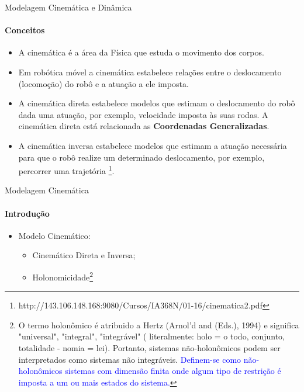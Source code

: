 \documentclass{beamer}
\begin{document}
\begin{frame}{Modelagem Cinemática e Dinâmica}
    \framesubtitle{Conceitos}
    \begin{itemize}
        \item A cinemática é a área da Física que estuda o movimento dos corpos.
        \item Em robótica móvel a cinemática estabelece relações entre o deslocamento (locomoção) do robô e a atuação a ele imposta.
        \item A cinemática direta estabelece modelos que estimam o deslocamento do robô dada uma atuação, por exemplo, velocidade imposta às suas rodas. A cinemática direta está relacionada as \textbf{Coordenadas Generalizadas}.
        \item A cinemática inversa estabelece modelos que estimam a atuação necessária para que o robô realize um determinado deslocamento, por exemplo, percorrer uma trajetória \footnote{http://143.106.148.168:9080/Cursos/IA368N/01-16/cinematica2.pdf}.
    \end{itemize}
\end{frame}


\begin{frame}{Modelagem Cinemática}
    \framesubtitle{Introdução}
    \setlength\extrarowheight{5pt}
    \begin{itemize}
        \item Modelo Cinemático:
              \begin{itemize}
                  \item Cinemático Direta e Inversa;
                  \item Holonomicidade\footnote{O termo holonômico é atribuido a Hertz (Arnol'd and (Eds.), 1994) e significa "universal", "integral", "integrável" ( literalmente: holo = o todo, conjunto, totalidade - nomia = lei). Portanto, sistemas não-holonômicos podem ser interpretados como sistemas não integráveis. \textcolor{blue}{Definem-se como não-holonômicos sistemas com dimensão finita onde algum tipo de restrição é imposta a um ou mais estados do sistema.}}
              \end{itemize}
    \end{itemize}

\end{frame}
\end{document}
